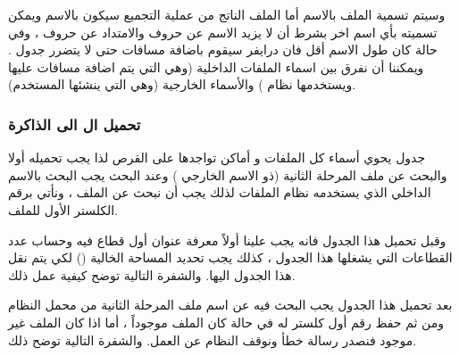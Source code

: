 \documentclass[document.tex]{subfiles}
\begin{document}
وسيتم تسمية الملف بالاسم  أما الملف الناتج من عملية التجميع سيكون بالاسم  ويمكن تسميته بأي اسم اخر بشرط أن لا يزيد الاسم عن  حروف والامتداد عن  حروف ، وفي حالة كان طول الاسم أقل فان درايفر  سيقوم باضافة مسافات  حتى لا يتضرر جدول . ويمكننا أن نفرق بين اسماء الملفات الداخلية (وهي التي يتم اضافة مسافات عليها ويستخدمها نظام ) والأسماء الخارجية (وهي التي ينشئها المستخدم).

\subsubsection{تحميل ال  الى الذاكرة}
جدول  يحوي أسماء كل الملفات و أماكن تواجدها على القرص لذا يجب تحميله أولا والبحث عن ملف المرحلة الثانية (ذو الاسم الخارجي ) وعند البحث يجب البحث بالاسم الداخلي الذي يستخدمه نظام الملفات لذلك يجب أن نبحث عن الملف  ، ونأتي برقم الكلستر الأول للملف.

وقبل تحميل هذا الجدول فانه يجب علينا أولاً معرفة عنوان أول قطاع فيه وحساب عدد القطاعات التي يشغلها هذا الجدول ، كذلك يجب تحديد المساحة الخالية () لكي يتم نقل هذا الجدول اليها. والشفرة التالية توضح كيفية عمل ذلك.
 
\begin{english}
\lstset{numberstyle=\tiny,numbers=left,stepnumber=1,numbersep=5pt,tabsize=2,extendedchars=true,breaklines=true,frame=b,showspaces=false, showtabs=false,xleftmargin=10pt,framexleftmargin=10pt,framexrightmargin=5pt,framexbottommargin=4pt,showstringspaces=false,language=[x86masm]Assembler}


\end{english}

بعد تحميل هذا الجدول يجب البحث فيه عن اسم ملف المرحلة الثانية من محمل النظام ومن ثم حفظ رقم أول كلستر له في حالة كان الملف موجوداً ، أما اذا كان الملف غير موجود فنصدر رسالة خطأ ونوقف النظام عن العمل. والشفرة التالية توضح ذلك.

\begin{english}
\lstset{numberstyle=\tiny,numbers=left,stepnumber=1,numbersep=5pt,tabsize=2,extendedchars=true,breaklines=true,frame=b,showspaces=false, showtabs=false,xleftmargin=10pt,framexleftmargin=10pt,framexrightmargin=5pt,framexbottommargin=4pt,showstringspaces=false,language=[x86masm]Assembler}


\end{english}
\end{document}
